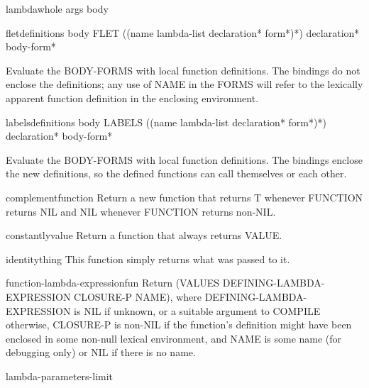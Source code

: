 \documentclass[10pt,english]{book}
\begin{document}
\begin{macro}{lambda}{\whole whole args \body body}
  
\end{macro}

\begin{specialop}{flet}{definitions \body body}
  FLET ({(name lambda-list declaration* form*)}*) declaration* body-form*

Evaluate the BODY-FORMS with local function definitions. The bindings do
not enclose the definitions; any use of NAME in the FORMS will refer to the
lexically apparent function definition in the enclosing environment.
\end{specialop}

\begin{specialop}{labels}{definitions \body body}
  LABELS ({(name lambda-list declaration* form*)}*) declaration* body-form*

Evaluate the BODY-FORMS with local function definitions. The bindings enclose
the new definitions, so the defined functions can call themselves or each
other.
\end{specialop}

\begin{function}{complement}{function}
  Return a new function that returns T whenever FUNCTION returns NIL and
   NIL whenever FUNCTION returns non-NIL.
\end{function}

\begin{function}{constantly}{value}
  Return a function that always returns VALUE.
\end{function}

\begin{function}{identity}{thing}
  This function simply returns what was passed to it.
\end{function}

\begin{function}{function-lambda-expression}{fun}
  Return (VALUES DEFINING-LAMBDA-EXPRESSION CLOSURE-P NAME), where
  DEFINING-LAMBDA-EXPRESSION is NIL if unknown, or a suitable argument
  to COMPILE otherwise, CLOSURE-P is non-NIL if the function's definition
  might have been enclosed in some non-null lexical environment, and
  NAME is some name (for debugging only) or NIL if there is no name.
\end{function}

\begin{constant}{lambda-parameters-limit}{}
  
\end{constant}
\end{document}
